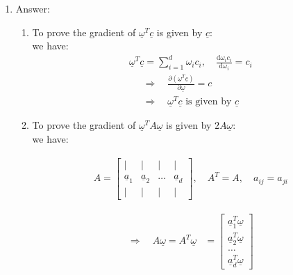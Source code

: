 \documentclass[11pt,letterpaper]{article}
\begin{document}
\begin{enumerate}

\item {}

\begin{flushleft}
Answer:
    \begin{enumerate}
        \item{
            To prove the gradient of $\underline{\omega}^T\underline c$ is given by $\underline c$: \\
            we have:\begin{align*}
                \underline\omega^T\underline c = \sum^d_{i=1} \omega_ic_i, \quad\frac{\mathrm d\omega_ic_i}{\mathrm d \omega_i}=c_i
            \end{align*}
            \begin{align*}
                \Rightarrow \quad\frac{\partial(\underline\omega^T\underline c)}{\partial\underline\omega} = c
                \\
            \Rightarrow \quad \text{$\underline{\omega}^T\underline c$ is given by $\underline c$}
            \end{align*}}

        \item{
            To prove the gradient of $\underline{\omega}^TA\underline\omega$ is given by $2A\underline\omega$: \\
            we have:
            
            \begin{align*}
                A = \begin{bmatrix}
                         | & | & | & | \\
                         \underline a_1 & \underline a_2 & \dots & \underline a_d\\
                         | & | & | & |
                    \end{bmatrix},
                \quad A^T = A, \quad a_{ij} = a_{ji}
            \end{align*}
            
            \begin{align*}
                \Rightarrow \quad A\underline\omega = A^T\underline\omega & =
                        \begin{bmatrix}
                            \underline a_1^T \underline\omega \\
                            \underline a_2^T \underline\omega \\
                            \dots \\
                            \underline a_d^T \underline\omega 
                        \end{bmatrix} 
            \end{align*}
            
}
\end{enumerate}
\end{flushleft}
\end{enumerate}
\end{document}
